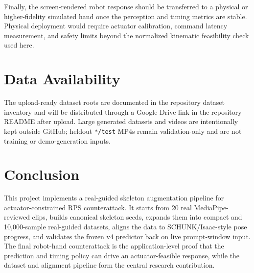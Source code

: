 \documentclass[conference]{IEEEtran}
\begin{document}
Finally, the screen-rendered robot response should be transferred to a physical or higher-fidelity simulated hand once the perception and timing metrics are stable. Physical deployment would require actuator calibration, command latency measurement, and safety limits beyond the normalized kinematic feasibility check used here.

\section{Data Availability}

The upload-ready dataset roots are documented in the repository dataset inventory and will be distributed through a Google Drive link in the repository README after upload. Large generated datasets and videos are intentionally kept outside GitHub; heldout \texttt{*/test} MP4s remain validation-only and are not training or demo-generation inputs.

\section{Conclusion}

This project implements a real-guided skeleton augmentation pipeline for actuator-constrained RPS counterattack. It starts from 20 real MediaPipe-reviewed clips, builds canonical skeleton seeds, expands them into compact and 10,000-sample real-guided datasets, aligns the data to SCHUNK/Isaac-style pose progress, and validates the frozen v4 predictor back on live prompt-window input. The final robot-hand counterattack is the application-level proof that the prediction and timing policy can drive an actuator-feasible response, while the dataset and alignment pipeline form the central research contribution.



\end{document}
